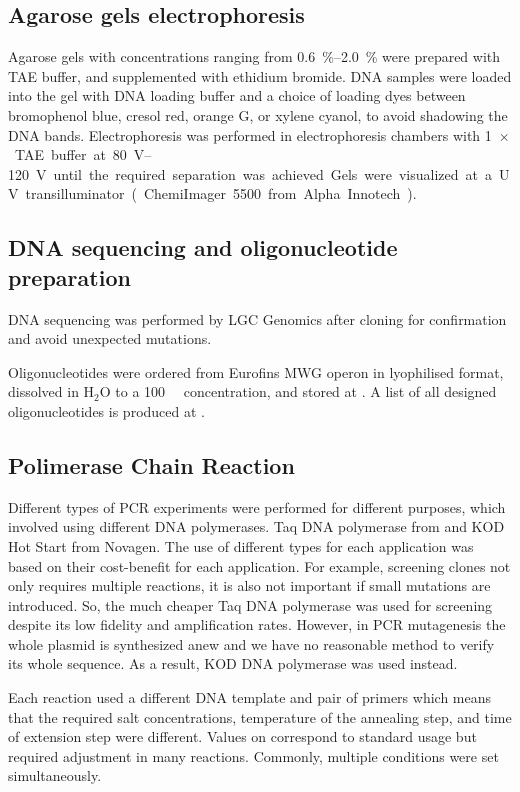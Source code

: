   \subsection{Agarose gels electrophoresis}
    Agarose gels with concentrations ranging from \SIrange{0.6}{2.0}{\percent} were prepared with TAE buffer,
    and supplemented with ethidium bromide. DNA samples were loaded into the gel with DNA loading buffer and a
    choice of loading dyes between bromophenol blue, cresol red, orange G, or xylene cyanol, to avoid shadowing
    the DNA bands. Electrophoresis was performed in electrophoresis chambers with \SI{1}{$\times$}~TAE buffer at
    \SIrange{80}{120}{\volt} until the required separation was achieved. Gels were visualized at a UV
    transilluminator (ChemiImager 5500 from Alpha Innotech).

  \subsection{DNA sequencing and oligonucleotide preparation}
    DNA sequencing was performed by LGC Genomics after cloning for confirmation and avoid unexpected mutations.
    
    Oligonucleotides were ordered from Eurofins MWG operon in lyophilised format, dissolved in H$_2$O to a
    \SI{100}{\micro\Molar} concentration, and stored at . A list of all designed oligonucleotides is
    produced at .

  \subsection{Polimerase Chain Reaction}
    Different types of PCR experiments were performed for different purposes, which involved using different DNA
    polymerases. Taq DNA polymerase from and KOD Hot Start from Novagen. The use of different types for each
    application was based on their cost-benefit for each application. For example, screening clones not only requires
    multiple reactions, it is also not important if small mutations are introduced. So, the much cheaper Taq
    DNA polymerase was used for screening despite its low fidelity and amplification rates. However, in PCR
    mutagenesis the whole plasmid is synthesized anew and we have no reasonable method to verify its whole
    sequence. As a result, KOD DNA polymerase was used instead.
    
    Each reaction used a different DNA template and pair of primers which means that the required salt concentrations,
    temperature of the annealing step, and time of extension step were different. Values on 
    correspond to standard usage but required adjustment in many reactions. Commonly, multiple conditions
    were set simultaneously.
    
